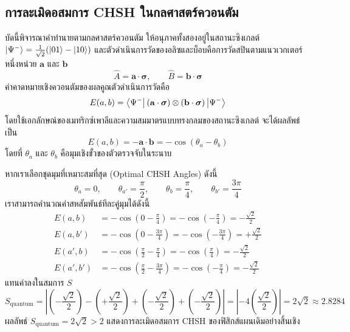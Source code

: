 \subsection{การละเมิดอสมการ CHSH ในกลศาสตร์ควอนตัม}
บัดนี้พิจารณาคำทำนายตามกลศาสตร์ควอนตัม ให้อนุภาคทั้งสองอยู่ในสถานะซิงเกลต์ $\ket{\Psi^-} = \frac{1}{\sqrt{2}}(\ket{01}-\ket{10})$ และตัวดำเนินการวัดของอลิซและบ็อบคือการวัดสปินตามแนวเวกเตอร์หนึ่งหน่วย $\mathbf{a}$ และ $\mathbf{b}$
\begin{equation}
\hat{A} = \mathbf{a} \cdot \boldsymbol{\sigma}, \qquad \hat{B} = \mathbf{b} \cdot \boldsymbol{\sigma}
\end{equation}
ค่าคาดหมายเชิงควอนตัมของผลคูณตัวดำเนินการวัดคือ
\begin{equation}
E(a, b) = \bra{\Psi^-} (\mathbf{a} \cdot \boldsymbol{\sigma}) \otimes (\mathbf{b} \cdot \boldsymbol{\sigma}) \ket{\Psi^-}
\end{equation}
โดยใช้เอกลักษณ์ของเมทริกซ์เพาลีและความสมมาตรแบบทรงกลมของสถานะซิงเกลต์ จะได้ผลลัพธ์เป็น
\begin{equation}
E(a, b) = -\mathbf{a} \cdot \mathbf{b} = -\cos(\theta_a - \theta_b)
\label{eq:quantum_singlet_correlation}
\end{equation}
โดยที่ $\theta_a$ และ $\theta_b$ คือมุมเชิงขั้วของตัวตรวจจับในระนาบ

หากเราเลือกชุดมุมที่เหมาะสมที่สุด (Optimal CHSH Angles) ดังนี้
\begin{equation}
\theta_a = 0, \qquad \theta_{a'} = \frac{\pi}{2}, \qquad \theta_b = \frac{\pi}{4}, \qquad \theta_{b'} = \frac{3\pi}{4}
\end{equation}
เราสามารถคำนวณค่าสหสัมพันธ์ทีละคู่มุมได้ดังนี้
\begin{align}
E(a, b) &= -\cos\left(0 - \frac{\pi}{4}\right) = -\cos\left(-\frac{\pi}{4}\right) = -\frac{\sqrt{2}}{2} \\
E(a, b') &= -\cos\left(0 - \frac{3\pi}{4}\right) = -\cos\left(-\frac{3\pi}{4}\right) = +\frac{\sqrt{2}}{2} \\
E(a', b) &= -\cos\left(\frac{\pi}{2} - \frac{\pi}{4}\right) = -\cos\left(\frac{\pi}{4}\right) = -\frac{\sqrt{2}}{2} \\
E(a', b') &= -\cos\left(\frac{\pi}{2} - \frac{3\pi}{4}\right) = -\cos\left(-\frac{\pi}{4}\right) = -\frac{\sqrt{2}}{2}
\end{align}
แทนค่าลงในสมการ $S$
\begin{equation}
S_{\text{quantum}} = \left| \left(-\frac{\sqrt{2}}{2}\right) - \left(+\frac{\sqrt{2}}{2}\right) + \left(-\frac{\sqrt{2}}{2}\right) + \left(-\frac{\sqrt{2}}{2}\right) \right| = \left| -4\left(\frac{\sqrt{2}}{2}\right) \right| = 2\sqrt{2} \approx 2.8284
\label{eq:tsirelson_bound_value}
\end{equation}
ผลลัพธ์ $S_{\text{quantum}} = 2\sqrt{2} > 2$ แสดงการละเมิดอสมการ CHSH ของฟิสิกส์แผนเดิมอย่างสิ้นเชิง

